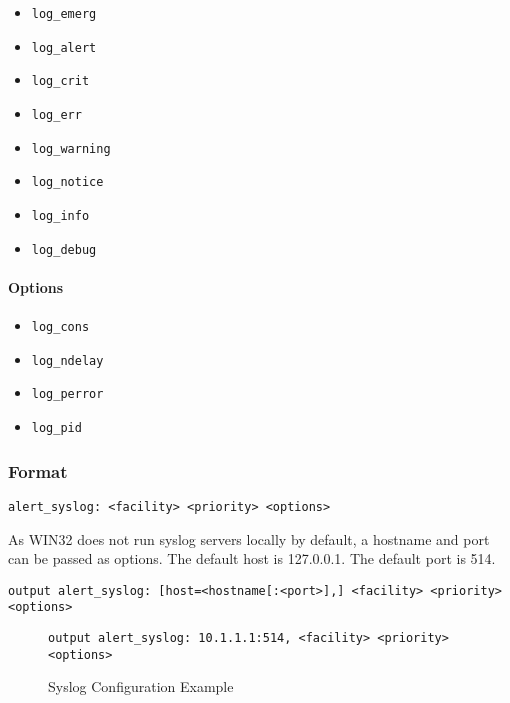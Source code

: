 \documentclass[english]{report}
\newenvironment{note}{
\samepage
    \vspace{10pt}{\textsf{
        {\hspace{7pt}\Huge{$\triangle$\hspace{-12.5pt}{\Large{$^!$}}}}\hspace{5pt}
        {\Large{NOTE}}
    }
    }
   \begin{center}
    \par\vspace{-17pt}

    \begin{lrbox}{\savepar}
    \begin{minipage}[r]{6in}
}
{
    \end{minipage}
    \end{lrbox}
    \fbox{
        \usebox{
            \savepar
        }
    }
    \par\vskip10pt
    \end{center}
}
\begin{document}
\begin{itemize}
\item \texttt{log\_emerg} 
\item \texttt{log\_alert}
\item \texttt{log\_crit}
\item \texttt{log\_err}
\item \texttt{log\_warning} 
\item \texttt{log\_notice}
\item \texttt{log\_info}
\item \texttt{log\_debug}
\end{itemize}

\paragraph{Options}

\begin{itemize}
\item \texttt{log\_cons} 
\item \texttt{log\_ndelay}
\item \texttt{log\_perror}
\item \texttt{log\_pid}
\end{itemize}

\subsubsection{Format}

\begin{verbatim}
alert_syslog: <facility> <priority> <options>
\end{verbatim}


\begin{note}
As WIN32 does not run syslog servers locally by default, a hostname and port
can be passed as options.  The default host is 127.0.0.1.  The default port is
514.
\end{note}

\begin{verbatim}
output alert_syslog: [host=<hostname[:<port>],] <facility> <priority> <options>
\end{verbatim}

\begin{figure}[!hbpt]
\begin{verbatim}
output alert_syslog: 10.1.1.1:514, <facility> <priority> <options>
\end{verbatim}

\caption{Syslog Configuration Example\label{syslog example}}
\end{figure}
\end{document}
